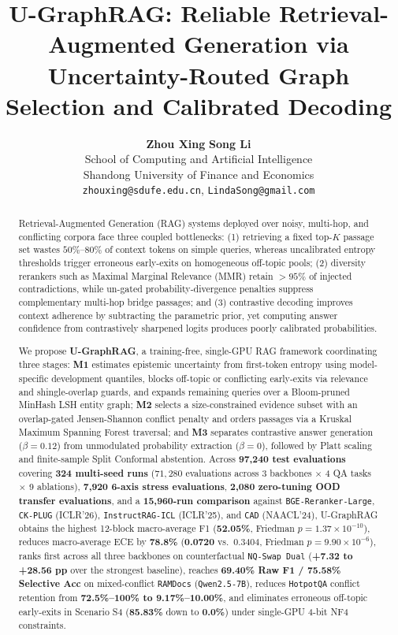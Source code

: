 \documentclass[11pt]{article}
\title{\textbf{U-GraphRAG}: Reliable Retrieval-Augmented Generation via Uncertainty-Routed Graph Selection and Calibrated Decoding}
\author{
  \textbf{Zhou Xing} \quad \textbf{Song Li} \\
  School of Computing and Artificial Intelligence \\
  Shandong University of Finance and Economics \\
  \texttt{zhouxing@sdufe.edu.cn}, \texttt{LindaSong@gmail.com}
}
\begin{document}
\maketitle

\begin{abstract}
Retrieval-Augmented Generation (RAG) systems deployed over noisy, multi-hop, and conflicting corpora face three coupled bottlenecks: (1) retrieving a fixed top-$K$ passage set wastes $50\%\text{--}80\%$ of context tokens on simple queries, whereas uncalibrated entropy thresholds trigger erroneous early-exits on homogeneous off-topic pools; (2) diversity rerankers such as Maximal Marginal Relevance (MMR) retain $>95\%$ of injected contradictions, while un-gated probability-divergence penalties suppress complementary multi-hop bridge passages; and (3) contrastive decoding improves context adherence by subtracting the parametric prior, yet computing answer confidence from contrastively sharpened logits produces poorly calibrated probabilities.

We propose \textbf{U-GraphRAG}, a training-free, single-GPU RAG framework coordinating three stages: \textbf{M1} estimates epistemic uncertainty from first-token entropy using model-specific development quantiles, blocks off-topic or conflicting early-exits via relevance and shingle-overlap guards, and expands remaining queries over a Bloom-pruned MinHash LSH entity graph; \textbf{M2} selects a size-constrained evidence subset with an overlap-gated Jensen-Shannon conflict penalty and orders passages via a Kruskal Maximum Spanning Forest traversal; and \textbf{M3} separates contrastive answer generation ($\beta=0.12$) from unmodulated probability extraction ($\beta=0$), followed by Platt scaling and finite-sample Split Conformal abstention. Across \textbf{97,240 test evaluations} covering \textbf{324 multi-seed runs} ($71,280$ evaluations across 3 backbones $\times$ 4 QA tasks $\times$ 9 ablations), \textbf{7,920 6-axis stress evaluations}, \textbf{2,080 zero-tuning OOD transfer evaluations}, and a \textbf{15,960-run comparison} against \texttt{BGE-Reranker-Large}, \texttt{CK-PLUG} (ICLR'26), \texttt{InstructRAG-ICL} (ICLR'25), and \texttt{CAD} (NAACL'24), U-GraphRAG obtains the highest 12-block macro-average F1 (\textbf{52.05\%}, Friedman $p = 1.37 \times 10^{-10}$), reduces macro-average ECE by \textbf{78.8\%} (\textbf{0.0720} vs.\ 0.3404, Friedman $p = 9.90 \times 10^{-6}$), ranks first across all three backbones on counterfactual \texttt{NQ-Swap Dual} (\textbf{+7.32 to +28.56 pp} over the strongest baseline), reaches \textbf{69.40\% Raw F1 / 75.58\% Selective Acc} on mixed-conflict \texttt{RAMDocs} (\texttt{Qwen2.5-7B}), reduces \texttt{HotpotQA} conflict retention from \textbf{72.5\%--100\% to 9.17\%--10.00\%}, and eliminates erroneous off-topic early-exits in Scenario S4 (\textbf{85.83\%} down to \textbf{0.0\%}) under single-GPU 4-bit NF4 constraints.
\end{abstract}
\end{document}
